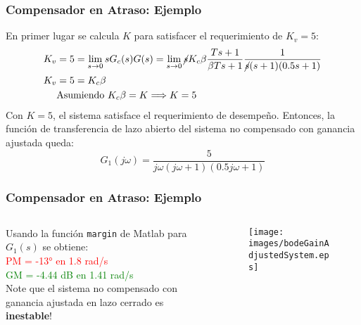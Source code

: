 \documentclass[aspectratio=169, handout]{beamer}
\theoremstyle{definition}
\theoremstyle{plain}
\theoremstyle{remark}
\begin{document}
\begin{frame}[<+->]\frametitle{Compensador en Atraso: Ejemplo}
	En primer lugar se calcula $K$ para satisfacer el requerimiento de $K_v = 5$:
	\begin{align*}
		K_v &= 5 = \lim_{s\rightarrow 0} sG_c(s)G(s) = \lim_{s \rightarrow 0} \cancel{s}K_c\beta\frac{Ts+1}{\beta T s + 1} \frac{1}{\cancel{s}(s+1)(0.5s+1)}\\
		K_v &= 5 = K_c\beta\\
		& \text{Asumiendo } K_c\beta = K \Longrightarrow K = 5
	\end{align*}
	\pause
	Con $K = 5$, el sistema satisface el requerimiento de desempeño. Entonces, la función de transferencia de lazo abierto del sistema no compensado con ganancia ajustada queda:
	\begin{equation*}
		G_1(j\omega) = \frac{5}{j\omega(j\omega+1)(0.5j\omega+1)}
	\end{equation*}
\end{frame}

\begin{frame}[<+->]\frametitle{Compensador en Atraso: Ejemplo}
  \begin{columns}
  	\begin{column}{0.3\textwidth}
			Usando la función \texttt{margin} de Matlab para $G_1(s)$ se obtiene:\\
			\textcolor{red}{\small PM = -\ang{13} en 1.8 rad/s}\\
			\textcolor{green}{\small GM = -4.44 dB en 1.41 rad/s}\\
			Note que el sistema no compensado con ganancia ajustada en lazo cerrado es \textbf{inestable}!
  	\end{column}
  	\begin{column}{0.7\textwidth}
			\begin{figure}
				\centering
				\texttt{[image: images/bodeGainAdjustedSystem.eps]} 	
		  \end{figure}
  	\end{column}
  \end{columns}
\end{frame}
\end{document}
